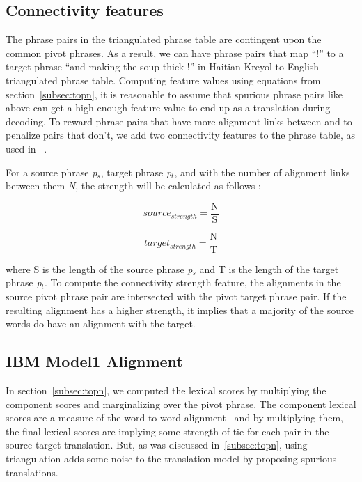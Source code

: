\subsection{Connectivity features}
\label{subsec:connectivity}
        The phrase pairs in the triangulated phrase table are contingent upon the common pivot phrases. As a result, we can have phrase pairs that map ``!'' to a target phrase ``and making the soup thick !'' in Haitian Kreyol to English triangulated phrase table. Computing feature values using equations from section~\ref{subsec:topn}, it is reasonable to assume that spurious phrase pairs like above can get a high enough feature value to end up as a translation during decoding. To reward phrase pairs that have more alignment links between and to penalize pairs that don't, we add two connectivity features to the phrase table, as used in ~\cite{Ahmed:13}.

        For a source phrase \emph{p$_s$}, target phrase \emph{p$_t$}, and with the number of alignment links between them \emph{N}, the strength will be calculated as follows :

        \begin{equation*}
                source_{strength} = \frac{\mathrm{N}}{\mathrm{S}}
        \end{equation*}

        \begin{equation*}
                target_{strength} = \frac{\mathrm{N}}{\mathrm{T}}
        \end{equation*}

        where S is the length of the source phrase \emph{p$_s$} and T is the length of the target phrase \emph{p$_t$}. To compute the connectivity strength feature, the alignments in the source pivot phrase pair are intersected with the pivot target phrase pair. If the resulting alignment has a higher strength, it implies that a majority of the source words do have an alignment with the target.


\subsection{IBM Model1 Alignment}
\label{subsec:model1}

        In section~\ref{subsec:topn}, we computed the lexical scores by multiplying the component scores and marginalizing over the pivot phrase. The component lexical scores are a measure of the word-to-word alignment~\cite{Koehn:03} and by multiplying them, the final lexical scores are implying some strength-of-tie for each pair in the source target translation. But, as was discussed in~\ref{subsec:topn}, using triangulation adds some noise to the translation model by proposing spurious translations.


